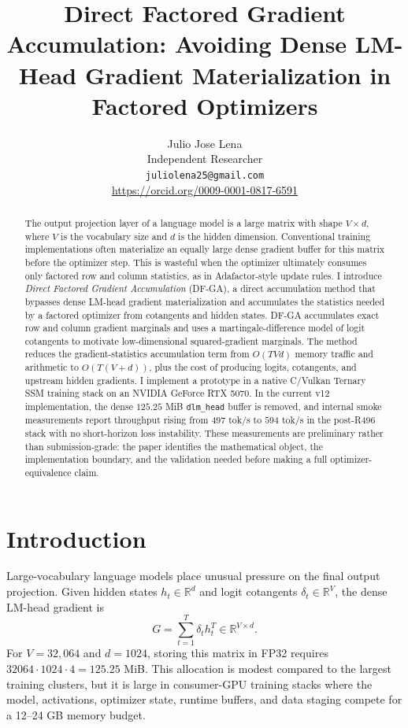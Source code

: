 \documentclass{article}
\title{Direct Factored Gradient Accumulation: Avoiding Dense LM-Head Gradient Materialization in Factored Optimizers}
\author{
  Julio Jose Lena \\
  Independent Researcher \\
  \texttt{juliolena25@gmail.com} \\
  \url{https://orcid.org/0009-0001-0817-6591}
}
\begin{document}
\maketitle

\begin{abstract}
The output projection layer of a language model is a large matrix with shape
$V \times d$, where $V$ is the vocabulary size and $d$ is the hidden dimension.
Conventional training implementations often materialize an equally large dense
gradient buffer for this matrix before the optimizer step. This is wasteful when
the optimizer ultimately consumes only factored row and column statistics, as in
Adafactor-style update rules. I introduce \emph{Direct Factored Gradient
Accumulation} (DF-GA), a direct accumulation method that bypasses dense
LM-head gradient materialization and accumulates the statistics needed by a
factored optimizer from cotangents and hidden states. DF-GA accumulates exact
row and column gradient marginals and uses a martingale-difference model of
logit cotangents to motivate low-dimensional squared-gradient marginals. The
method reduces the gradient-statistics accumulation term from $O(TVd)$ memory
traffic and arithmetic to $O(T(V+d))$, plus the cost of producing logits,
cotangents, and upstream hidden gradients. I implement a prototype in a native
C/Vulkan Ternary SSM training stack on an NVIDIA GeForce RTX 5070. In the
current v12 implementation, the dense $125.25$ MiB \texttt{dlm\_head} buffer is
removed, and internal smoke measurements report throughput rising from
$497$ tok/s to $594$ tok/s in the post-R496 stack with no short-horizon loss
instability. These measurements are preliminary rather than submission-grade:
the paper identifies the mathematical object, the implementation boundary, and
the validation needed before making a full optimizer-equivalence claim.
\end{abstract}

\section{Introduction}

Large-vocabulary language models place unusual pressure on the final output
projection. Given hidden states $h_t \in \mathbb{R}^d$ and logit cotangents
$\delta_t \in \mathbb{R}^V$, the dense LM-head gradient is
\begin{equation}
  G = \sum_{t=1}^T \delta_t h_t^T \in \mathbb{R}^{V \times d}.
\end{equation}
For $V=32{,}064$ and $d=1024$, storing this matrix in FP32 requires
$32064 \cdot 1024 \cdot 4 = 125.25$ MiB. This allocation is modest compared to
the largest training clusters, but it is large in consumer-GPU training stacks
where the model, activations, optimizer state, runtime buffers, and data staging
compete for a 12--24 GB memory budget.
\end{document}
